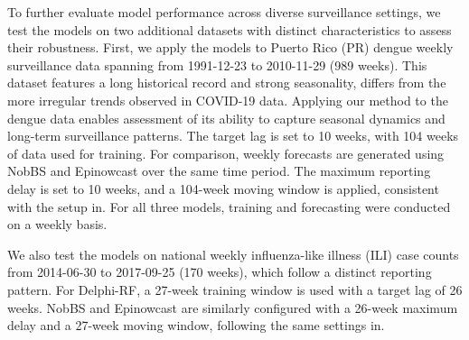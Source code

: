 To further evaluate model performance across diverse surveillance settings, we test the models on two additional datasets with distinct characteristics to assess their robustness. First, we apply the models to Puerto Rico (PR) dengue weekly surveillance data spanning from 1991-12-23 to 2010-11-29 (989 weeks). This dataset features a long historical record and strong seasonality, differs from the more irregular trends observed in COVID-19 data. Applying our method to the dengue data enables assessment of its ability to capture seasonal dynamics and long-term surveillance patterns. The target lag is set to 10 weeks, with 104 weeks of data used for training. For comparison, weekly forecasts are generated using NobBS and Epinowcast over the same time period. The maximum reporting delay is set to 10 weeks, and a 104-week moving window is applied, consistent with the setup in\cite{McGough2020}. For all three models, training and forecasting were conducted on a weekly basis.

We also test the models on national weekly influenza-like illness (ILI) case counts from 2014-06-30 to 2017-09-25 (170 weeks), which follow a distinct reporting pattern. For Delphi-RF, a 27-week training window is used with a target lag of 26 weeks. NobBS and Epinowcast are similarly configured with a 26-week maximum delay and a 27-week moving window, following the same settings in\cite{McGough2020}.


